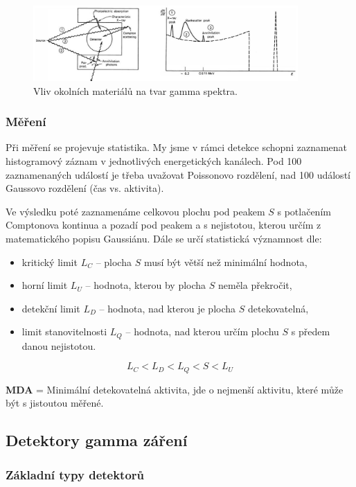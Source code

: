 \begin{figure}[H]
    \centering
    \includegraphics[width=0.9\textwidth]{img/vliv_materialu.JPG}
    \caption{Vliv okolních materiálů na tvar gamma spektra.}
\end{figure}

\subsubsection{Měření}

Při měření se projevuje statistika. My jsme v rámci detekce schopni zaznamenat histogramový záznam v jednotlivých energetických kanálech. Pod 100 zaznamenaných událostí je třeba uvažovat Poissonovo rozdělení, nad 100 událostí Gaussovo rozdělení (čas vs. aktivita). 

Ve výsledku poté zaznamenáme celkovou plochu pod peakem $S$ s potlačením Comptonova kontinua a pozadí pod peakem a s nejistotou, kterou určím z matematického popisu Gaussiánu. Dále se určí statistická významnost dle:

\begin{itemize}
    \item kritický limit $L_C$ -- plocha $S$ musí být větší než minimální hodnota,
    \item horní limit $L_U$ -- hodnota, kterou by plocha $S$ neměla překročit,
    \item detekční limit $L_D$ -- hodnota, nad kterou je plocha $S$ detekovatelná,
    \item limit stanovitelnosti $L_Q$ -- hodnota, nad kterou určím plochu $S$ s předem danou nejistotou.
\end{itemize}

$$ L_C < L_D < L_Q < S < L_U $$

\textbf{MDA} = Minimální detekovatelná aktivita, jde o nejmenší aktivitu, které může být s jistoutou měřené.

\subsection{Detektory gamma záření}

\subsubsection{Základní typy detektorů}

